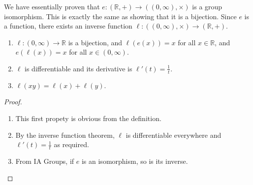 \begin{remark}
	We have essentially proven that \(e \colon (\mathbb R, +) \to ((0, \infty), \times)\) is a group isomorphism.
	This is exactly the same as showing that it is a bijection.
	Since \(e\) is a function, there exists an inverse function \(\ell \colon ((0, \infty), \times) \to (\mathbb R, +)\).
\end{remark}
\begin{theorem}
	\begin{enumerate}
		\item \(\ell \colon (0, \infty) \to \mathbb R\) is a bijection, and \(\ell(e(x)) = x\) for all \(x \in \mathbb R\), and \(e(\ell(x)) = x\) for all \(x \in (0, \infty)\).
		\item \(\ell\) is differentiable and its derivative is \(\ell'(t) = \frac{1}{t}\).
		\item \(\ell(xy) = \ell(x) + \ell(y)\).
	\end{enumerate}
\end{theorem}
\begin{proof}
	\begin{enumerate}
		\item This first propety is obvious from the definition.
		\item By the inverse function theorem, \(\ell\) is differentiable everywhere and \(\ell'(t) = \frac{1}{t}\) as required.
		\item From IA Groups, if \(e\) is an isomorphism, so is its inverse.
	\end{enumerate}
\end{proof}

